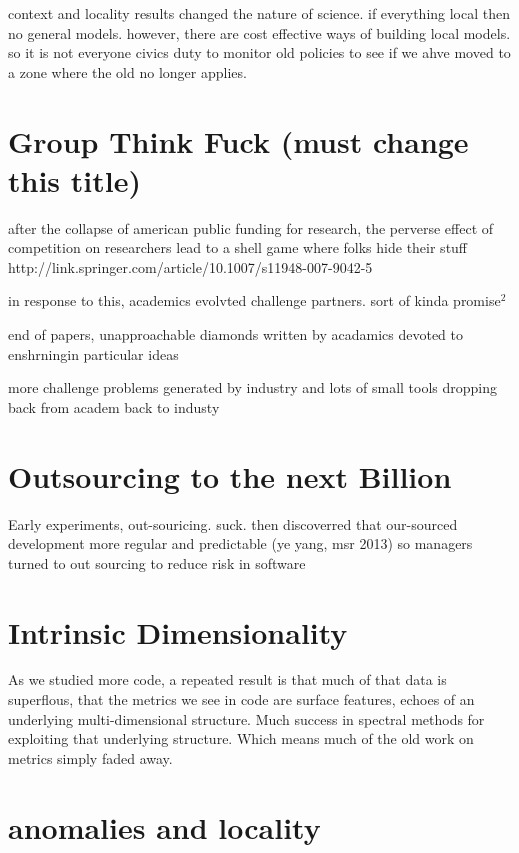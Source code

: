 \documentclass[journal]{IEEEtran}
\begin{document}
context and locality results changed the nature of science. if everything local then no general models. however, there are cost effective ways of building local models. so it is not everyone civics duty to monitor old policies to see if we ahve moved to a zone where the old no longer applies.

\section{Group Think Fuck (must change this title)}

after the collapse of american public funding for research, the
perverse effect of competition on researchers lead to a shell game where folks hide their stuff http://link.springer.com/article/10.1007/s11948-007-9042-5

in response to this, academics evolvted challenge partners.
sort of kinda promise$^2$

end of papers, unapproachable diamonds written by acadamics devoted
to enshrningin particular ideas

more challenge problems generated by industry and lots of small tools dropping
back from academ back to industy



\section{Outsourcing to the next Billion}

Early experiments, out-souricing. suck. then discoverred
that our-sourced development more regular and  predictable (ye yang, msr 2013) so managers turned to out sourcing to reduce risk in
software 

\section{Intrinsic Dimensionality}

As we studied more code, a repeated result is that much of that data is superflous, that the metrics we see in code are surface features, echoes of an underlying multi-dimensional structure. Much success in spectral methods for exploiting that underlying structure. Which means much of the old work on metrics simply faded away.

\section{anomalies and locality}
\end{document}
